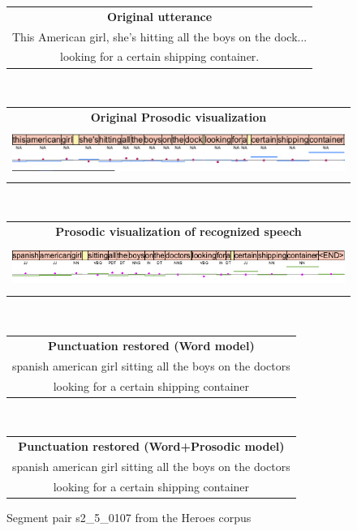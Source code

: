 \begin{figure}[h]
    \centering
    \begin{tabular}{c}
    \textbf{Original utterance}\\
    This American girl, she's hitting all the boys on the dock... \\ looking for a certain shipping container. \\
    \end{tabular}
    \\
    \begin{tabular}{c}
    \textbf{Original Prosodic visualization}\\
    \includegraphics[height=1.5cm]{img/s2_5_0107_asr.png} \\
    \end{tabular}
    \\
    \begin{tabular}{c}
    \textbf{Prosodic visualization of recognized speech}\\
    \includegraphics[height=1.5cm]{img/s2_5_0107.png} \\
    \end{tabular}
    \\
    \begin{tabular}{c}
    \textbf{Punctuation restored (Word model)}\\
    spanish american girl\mycirc{\textbf{,}} sitting all the boys on the doctors \\ looking for a certain shipping container\mycirc{\textbf{.}}   \\
    \end{tabular}
    \\
    \begin{tabular}{c}
    \textbf{Punctuation restored (Word+Prosodic model)}\\
    spanish american girl sitting all the boys on the doctors \\ looking for a certain shipping container\mycirc{\textbf{.}}  \\
    \end{tabular}
    \caption{Segment pair s2\_5\_0107 from the Heroes corpus}
    \label{figure:heroes_pp_2}
\end{figure}
